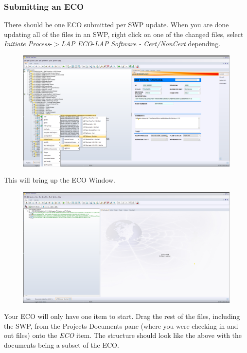\documentclass[10pt]{article}
\begin{document}
            \subsubsection{Submitting an ECO}
                There should be one ECO submitted per SWP update. When you are done updating all of the files in an SWP, right click on one of the changed files, select \emph{Initiate Process}-$>$\emph{LAP ECO}-\emph{LAP Software - Cert/NonCert} depending.
                \begin{figure}[H]
                    \centerline{\includegraphics[width=\textwidth]{References/ST ECO Initiate Process.png}}
                \end{figure}
                This will bring up the ECO Window.
                \begin{figure}[H]
                    \centerline{\includegraphics[width=\textwidth]{References/ST ECO Window.png}}
                \end{figure}
                Your ECO will only have one item to start. Drag the rest of the files, including the SWP, from the Projects Documents pane (where you were checking in and out files) onto the \emph{ECO} item. The structure should look like the above with the documents being a subset of the ECO. \\
\end{document}
